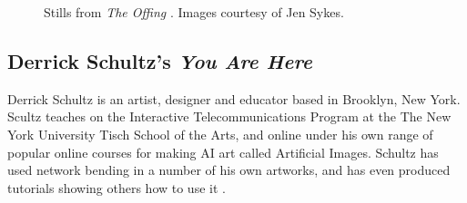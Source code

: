 \begin{figure}[!htbp]
    \caption[Stills from \textit{The Offing}]{Stills from \textit{The Offing} \citep{sykes2022offing}. Images courtesy of Jen Sykes.}
    \label{fig:c7:offing}
 \end{figure}

\subsection{Derrick Schultz's \textit{You Are Here}}

Derrick Schultz is an artist, designer and educator based in Brooklyn, New York. Scultz teaches on the Interactive Telecommunications Program at the The New York University Tisch School of the Arts, and online under his own range of popular online courses for making AI art called Artificial Images. 
Schultz has used network bending in a number of his own artworks, and has even produced tutorials showing others how to use it \citep{schultz2020netbending}. 

